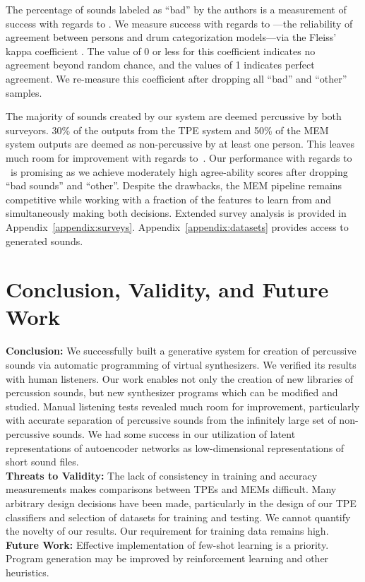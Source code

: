 \documentclass[runningheads,a4paper]{llncs}
\begin{document}
The percentage of sounds labeled as \enquote{bad} by the authors is a measurement of success with regards to \decfirst. We measure success with regards to \decsecond---the reliability of agreement between persons and drum categorization models---via the Fleiss' kappa coefficient \cite{fleiss1971measuring}. The value of 0 or less for this coefficient indicates no agreement beyond random chance, and the values of 1 indicates perfect agreement. We re-measure this coefficient after dropping all \enquote{bad} and \enquote{other} samples. 

The majority of sounds created by our system are deemed percussive by both surveyors. 30\% of the outputs from the TPE system and 50\% of the MEM system outputs are deemed as non-percussive by at least one person. This leaves much room for improvement with regards to~\decfirst. Our performance with regards to \decsecond~is promising as we achieve moderately high agree-ability scores after dropping \enquote{bad sounds} and \enquote{other}. Despite the drawbacks, the MEM pipeline remains competitive while working with a fraction of the features to learn from and simultaneously making both decisions. Extended survey analysis is provided in Appendix~\ref{appendix:surveys}. Appendix~\ref{appendix:datasets} provides access to generated sounds.

\section{Conclusion, Validity, and Future Work} 

\textbf{Conclusion:} We successfully built a generative system for creation of percussive sounds via automatic programming of virtual synthesizers. We verified its results with human listeners.
Our work enables not only the creation of new libraries of percussion sounds, but new synthesizer programs which can be modified and studied. 
Manual listening tests revealed much room for improvement, particularly with accurate separation of percussive sounds from the infinitely large set of non-percussive sounds. We had some success in our utilization of latent representations of autoencoder networks as low-dimensional representations of short sound files. \\ 
\textbf{Threats to Validity:} The lack of consistency in training and accuracy measurements makes comparisons between TPEs and MEMs difficult. Many arbitrary design decisions have been made, particularly in the design of our TPE classifiers and selection of datasets for training and testing. We cannot quantify the novelty of our results. Our requirement for training data remains high. \\
\textbf{Future Work:} Effective implementation of few-shot learning is a priority. Program generation may be improved by reinforcement learning and other heuristics.
\end{document}
